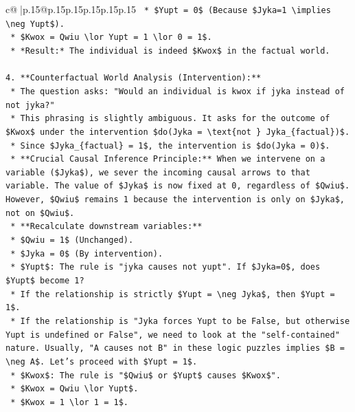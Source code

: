\documentclass{article}
\begin{document}
{\begin{supertabular}{c@{$\;$}|p{.15\linewidth}@{}p{.15\linewidth}p{.15\linewidth}p{.15\linewidth}p{.15\linewidth}p{.15\linewidth}}
{{{\texttt{    *   \$Yupt = 0\$ (Because \$Jyka=1 \textbackslash{}implies \textbackslash{}neg Yupt\$).} \\
\texttt{    *   \$Kwox = Qwiu \textbackslash{}lor Yupt = 1 \textbackslash{}lor 0 = 1\$.} \\
\texttt{    *   *Result:* The individual is indeed \$Kwox\$ in the factual world.} \\
\\ 
\texttt{4.  **Counterfactual World Analysis (Intervention):**} \\
\texttt{    *   The question asks: "Would an individual is kwox if jyka instead of not jyka?"} \\
\texttt{    *   This phrasing is slightly ambiguous. It asks for the outcome of \$Kwox\$ under the intervention \$do(Jyka = \textbackslash{}text\{not \} Jyka\_\{factual\})\$.} \\
\texttt{    *   Since \$Jyka\_\{factual\} = 1\$, the intervention is \$do(Jyka = 0)\$.} \\
\texttt{    *   **Crucial Causal Inference Principle:** When we intervene on a variable (\$Jyka\$), we sever the incoming causal arrows to that variable. The value of \$Jyka\$ is now fixed at 0, regardless of \$Qwiu\$. However, \$Qwiu\$ remains 1 because the intervention is only on \$Jyka\$, not on \$Qwiu\$.} \\
\texttt{    *   **Recalculate downstream variables:**} \\
\texttt{        *   \$Qwiu = 1\$ (Unchanged).} \\
\texttt{        *   \$Jyka = 0\$ (By intervention).} \\
\texttt{        *   \$Yupt\$: The rule is "jyka causes not yupt". If \$Jyka=0\$, does \$Yupt\$ become 1?} \\
\texttt{            *   If the relationship is strictly \$Yupt = \textbackslash{}neg Jyka\$, then \$Yupt = 1\$.} \\
\texttt{            *   If the relationship is "Jyka forces Yupt to be False, but otherwise Yupt is undefined or False", we need to look at the "self{-}contained" nature. Usually, "A causes not B" in these logic puzzles implies \$B = \textbackslash{}neg A\$. Let's proceed with \$Yupt = 1\$.} \\
\texttt{        *   \$Kwox\$: The rule is "\$Qwiu\$ or \$Yupt\$ causes \$Kwox\$".} \\
\texttt{            *   \$Kwox = Qwiu \textbackslash{}lor Yupt\$.} \\
\texttt{            *   \$Kwox = 1 \textbackslash{}lor 1 = 1\$.} \\
}}}
\end{supertabular}}
\end{document}
